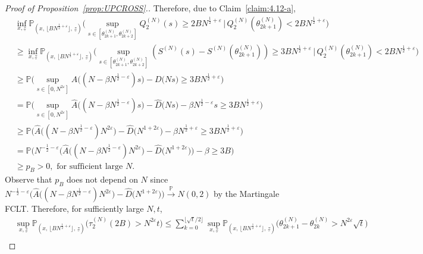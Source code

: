 \documentclass[11pt, reqno]{article}
\numberwithin{equation}{section}
\numberwithin{theorem}{section}
\newcommand{\pto}{\ensuremath{\xrightarrow{\ \mathbb{P}\ }}}  %
\begin{document}
\begin{proof}[Proof of Proposition~\ref{prop:UPCROSS}.]
Therefore, due to Claim~\ref{claim:4.12-a},
\begin{align}\label{eq:lem4.11-2}
    &\inf_{x,\underline{z}}\mathbb{P}_{(x, \, \lfloor BN^{\frac{1}{2}+\varepsilon} \rfloor, \,\underline{z})}\Big(\sup_{s\in[\theta^{(N)}_{2k+1},\theta^{(N)}_{2k+2}]}Q^{(N)}_2(s)\geq 2BN^{\frac{1}{2}+\varepsilon} \, | \, Q^{(N)}_2(\theta^{(N)}_{2k+1})<2BN^{\frac{1}{2}+\varepsilon}\Big)\nonumber\\
    &\geq  \inf_{x,\underline{z}}\mathbb{P}_{(x, \, \lfloor BN^{\frac{1}{2}+\varepsilon} \rfloor, \,\underline{z})}\Big(\sup_{s\in[\theta^{(N)}_{2k+1},\theta^{(N)}_{2k+2}]}(S^{(N)}(s)-S^{(N)}(\theta^{(N)}_{2k+1}))\geq 3BN^{\frac{1}{2}+\varepsilon} \, | \,Q^{(N)}_2(\theta^{(N)}_{2k+1})<2BN^{\frac{1}{2}+\varepsilon}\Big)\nonumber\\
    &\geq  \mathbb{P}\Big(\sup_{s\in[0,N^{2\varepsilon}]}A\big((N-\beta N^{\frac{1}{2}-\varepsilon})s\big)-D\big(Ns\big)\geq 3BN^{\frac{1}{2}+\varepsilon}\Big)\nonumber\\
    &= \mathbb{P}\Big(\sup_{s\in[0,N^{2\varepsilon}]}\hat{A}\big((N-\beta N^{\frac{1}{2}-\varepsilon})s\big)-\hat{D}\big(Ns\big)-\beta N^{\frac{1}{2}-\varepsilon}s\geq 3BN^{\frac{1}{2}+\varepsilon}\Big)\nonumber\\
    &\geq  \mathbb{P}\Big(\hat{A}\big((N-\beta N^{\frac{1}{2}-\varepsilon})N^{2\varepsilon}\big)-\hat{D}\big(N^{1+2\varepsilon}\big)-\beta N^{\frac{1}{2}+\varepsilon}\geq 3BN^{\frac{1}{2}+\varepsilon}\Big)\nonumber\\
    &= \mathbb{P}\Big(N^{-\frac{1}{2}-\varepsilon}\big(\hat{A}\big((N-\beta N^{\frac{1}{2}-\varepsilon})N^{2\varepsilon}\big)-\hat{D}\big(N^{1+2\varepsilon}\big)\big)-\beta \geq 3B\Big)\nonumber\\
    &\geq  p_B>0, \text{ for sufficient large }N.
\end{align}
Observe that $p_B$ does not depend on $N$ since $N^{-\frac{1}{2}-\varepsilon}\big(\hat{A}\big((N-\beta N^{\frac{1}{2}-\varepsilon})N^{2\varepsilon}\big)-\hat{D}\big(N^{1+2\varepsilon}\big)\big)\pto N(0,2)$ by the  Martingale FCLT.
Therefore, for sufficiently large $N,t$,
\begin{align*}
    &\sup_{x,\underline{z}} \mathbb{P}_{(x, \, \lfloor BN^{\frac{1}{2}+\varepsilon} \rfloor, \,\underline{z})}\big(\tau^{(N)}_2(2B)>N^{2\varepsilon}t\big)
    \leq  \sum_{k=0}^{\lfloor\sqrt{t}/2\rfloor}\sup_{x,\underline{z}} \mathbb{P}_{(x, \, \lfloor BN^{\frac{1}{2}+\varepsilon} \rfloor, \,\underline{z})}\big(\theta^{(N)}_{2k+1}-\theta^{(N)}_{2k}>N^{2\varepsilon}\sqrt{t}\big)\\

\end{align*}
\end{proof}
\end{document}
